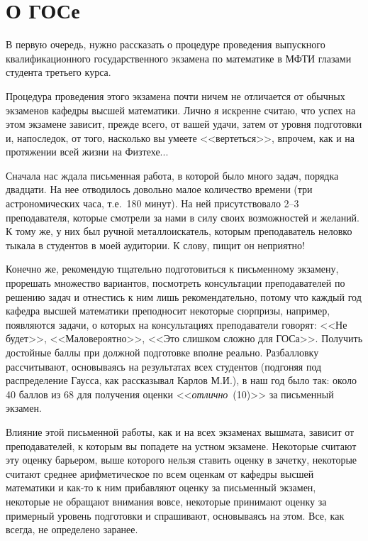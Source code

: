 \chapter*{О ГОСе\footnotemark}

В первую очередь, нужно рассказать о процедуре проведения выпускного квалификационного государственного экзамена по математике в МФТИ глазами студента третьего курса. 

Процедура проведения этого экзамена почти ничем не отличается от обычных экзаменов кафедры высшей математики. 
Лично я искренне считаю, что успех на этом экзамене зависит, прежде всего, от вашей удачи, затем от уровня подготовки и, напоследок, от того, насколько вы умеете <<вертеться>>, впрочем, как и на протяжении всей жизни на Физтехе...

Сначала нас ждала письменная работа, в которой было много задач, порядка двадцати. На нее отводилось довольно малое количество времени (три астрономических часа, т.е.~180 минут). На ней присутствовало 2--3 преподавателя, которые смотрели за нами в силу своих возможностей и желаний. К тому же, у них был ручной металлоискатель, которым преподаватель неловко тыкала в студентов в моей аудитории. К слову, пищит он неприятно! 

Конечно же, рекомендую тщательно подготовиться к письменному экзамену, прорешать множество вариантов, посмотреть консультации преподавателей по решению задач и отнестись к ним лишь рекомендательно, потому что каждый год кафедра высшей математики преподносит некоторые сюрпризы, например, появляются задачи, о которых на консультациях преподаватели говорят: <<Не будет>>, <<Маловероятно>>, <<Это слишком сложно для ГОСа>>. Получить достойные баллы при должной подготовке вполне реально. Разбалловку рассчитывают, основываясь на результатах всех студентов (подгоняя под распределение Гаусса, как рассказывал Карлов М.И.), в наш год было так: около 40 баллов из 68 для получения оценки <<\textit{отлично}~(10)>> за письменный экзамен.

Влияние этой письменной работы, как и на всех экзаменах вышмата, зависит от преподавателей, к которым вы попадете на устном экзамене. Некоторые считают эту оценку барьером, выше которого нельзя ставить оценку в зачетку, некоторые считают среднее арифметическое по всем оценкам от кафедры высшей математики и как-то к ним прибавляют оценку за письменный экзамен, некоторые не обращают внимания вовсе, некоторые принимают оценку за примерный уровень подготовки и спрашивают, основываясь на этом. Все, как всегда, не определено заранее.

